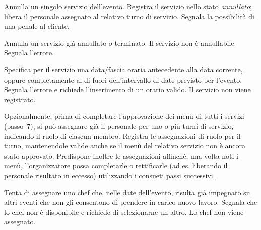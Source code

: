 
\uctablebegin
    {Annulla un singolo servizio dell'evento.}
    {Registra il servizio nello stato \emph{annullato}; libera il
     personale assegnato al relativo turno di servizio. Segnala la
     possibilità di una penale al cliente.}
\uctableend


\uctablebegin
    {Annulla un servizio già annullato o terminato.}
    {Il servizio non è annullabile. Segnala l'errore.}
\uctableend


\uctablebegin
    {Specifica per il servizio una data/fascia oraria antecedente alla
     data corrente, oppure completamente al di fuori dell'intervallo di
     date previsto per l'evento.}
    {Segnala l'errore e richiede l'inserimento di un orario valido. Il
     servizio non viene registrato.}
\uctableend


\uctablebegin
    {Opzionalmente, prima di completare l'approvazione dei menù di tutti i servizi
     (passo~7), si può assegnare già il personale per uno o più turni di
     servizio, indicando il ruolo di ciascun membro.}
    {Registra le assegnazioni di ruolo per il turno, mantenendole valide
     anche se il menù del relativo servizio non è ancora stato
     approvato. Predispone inoltre le assegnazioni affinché, una volta
     noti i menù, l'organizzatore possa completarle o rettificarle
     (ad es. liberando il personale risultato in eccesso) utilizzando
     i consueti passi successivi.}
\uctableend


\uctablebegin
    {Tenta di assegnare uno chef che, nelle date dell'evento, risulta
     già impegnato su altri eventi che non gli consentono di prendere
     in carico nuovo lavoro.}
    {Segnala che lo chef non è disponibile e richiede di selezionarne
     un altro. Lo chef non viene assegnato.}
\uctableend

